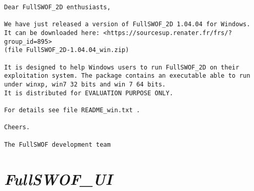 \documentclass[a4paper, 11pt]{article}
\newcommand{\FullSWOFUI}{\emph{FullSWOF\_UI}}
\begin{document}
\begin{enumerate}
\begin{verbatim}
Dear FullSWOF_2D enthusiasts,

We have just released a version of FullSWOF_2D 1.04.04 for Windows.
It can be downloaded here: <https://sourcesup.renater.fr/frs/?group_id=895>
(file FullSWOF_2D-1.04.04_win.zip)

It is designed to help Windows users to run FullSWOF_2D on their 
exploitation system. The package contains an executable able to run 
under winxp, win7 32 bits and win 7 64 bits.
It is distributed for EVALUATION PURPOSE ONLY.

For details see file README_win.txt .

Cheers.

The FullSWOF development team 
\end{verbatim}
\end{enumerate}


\section{\FullSWOFUI{}}
\end{document}
